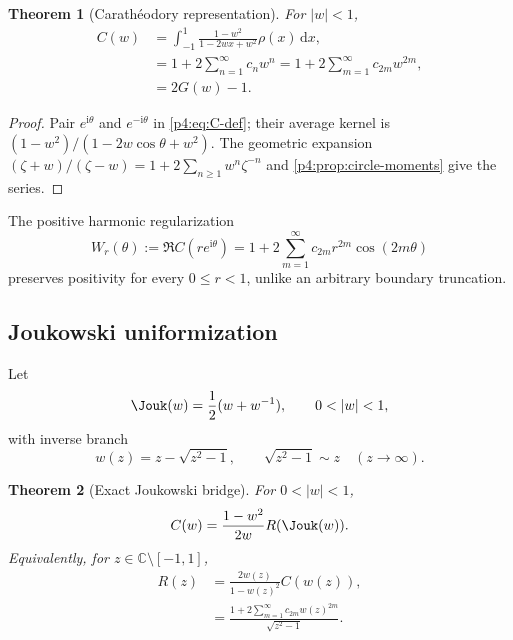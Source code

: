 \documentclass[11pt,oneside]{article}
\newtheorem{theorem}{Theorem}[section]
\theoremstyle{definition}
\newcommand{\dd}{\,\mathrm d}
\newcommand{\ii}{\mathrm i}
\begin{document}
\begin{theorem}[Carath\'eodory representation]
\label{p4:thm:C-representation}
For \(|w|<1\),
\begin{align}
 C(w)
 &=\int_{-1}^{1}\frac{1-w^2}{1-2wx+w^2}\rho(x)\dd x,
 \label{p4:eq:C-real-integral}\\
 &=1+2\sum_{n=1}^{\infty}c_nw^n
 =1+2\sum_{m=1}^{\infty}c_{2m}w^{2m},
 \label{p4:eq:C-series}\\
 &=2G(w)-1.
 \label{p4:eq:C-G}
\end{align}
\end{theorem}

\begin{proof}
Pair \(e^{\ii\theta}\) and \(e^{-\ii\theta}\) in \eqref{p4:eq:C-def}; their average kernel is
\((1-w^2)/(1-2w\cos\theta+w^2)\). The geometric expansion
\((\zeta+w)/(\zeta-w)=1+2\sum_{n\ge1}w^n\zeta^{-n}\) and
\cref{p4:prop:circle-moments} give the series.
\end{proof}

The positive harmonic regularization
\begin{equation}
 W_r(\theta):=\Re C(re^{\ii\theta})
 =1+2\sum_{m=1}^{\infty}c_{2m}r^{2m}\cos(2m\theta)
 \label{p4:eq:Wr}
\end{equation}
preserves positivity for every \(0\le r<1\), unlike an arbitrary boundary truncation.

\subsection{Joukowski uniformization}

Let
\begin{equation}
 \Jouk(w)=\frac12(w+w^{-1}),\qquad 0<|w|<1,
 \label{p4:eq:Joukowski}
\end{equation}
with inverse branch
\begin{equation}
 w(z)=z-\sqrt{z^2-1},
 \qquad \sqrt{z^2-1}\sim z\quad(z\to\infty).
 \label{p4:eq:Joukowski-inverse}
\end{equation}

\begin{theorem}[Exact Joukowski bridge]
\label{p4:thm:Joukowski-bridge}
For \(0<|w|<1\),
\begin{equation}
 C(w)=\frac{1-w^2}{2w}R(\Jouk(w)).
 \label{p4:eq:C-R-Jouk}
\end{equation}
Equivalently, for \(z\in\mathbb C\setminus[-1,1]\),
\begin{align}
 R(z)&=\frac{2w(z)}{1-w(z)^2}C(w(z)),
 \label{p4:eq:R-C-w}\\
 &=\frac{1+2\sum_{m=1}^{\infty}c_{2m}w(z)^{2m}}
 {\sqrt{z^2-1}}.
 \label{p4:eq:R-Cheb-series}
\end{align}
\end{theorem}
\end{document}
